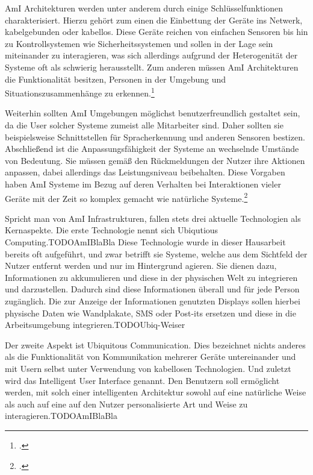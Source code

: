 AmI Architekturen werden unter anderem durch einige Schlüsselfunktionen charakterisiert. Hierzu gehört zum einen die Einbettung der Geräte ins Netwerk, kabelgebunden oder kabellos. Diese Geräte reichen von einfachen Sensoren bis hin zu Kontrollsystemen wie Sicherheitssystemen und sollen in der Lage sein miteinander zu interagieren, was sich allerdings aufgrund der Heterogenität der Systeme oft als schwierig herausstellt. Zum anderen müssen AmI Architekturen die Funktionalität besitzen, Personen in der Umgebung und Situationszusammenhänge zu erkennen.\footcite[Vgl.][Seite 585]{SpecialIssue}

Weiterhin sollten AmI Umgebungen möglichst benutzerfreundlich gestaltet sein, da die User solcher Systeme zumeist alle Mitarbeiter sind. Daher sollten sie beispielsweise Schnittstellen für Spracherkennung und anderen Sensoren bestizen. Abschließend ist die Anpassungsfähigkeit der Systeme an wechselnde Umstände von Bedeutung. Sie müssen gemäß den Rückmeldungen der Nutzer ihre Aktionen anpassen, dabei allerdings das Leistungsniveau beibehalten. Diese Vorgaben haben AmI Systeme im Bezug auf deren Verhalten bei Interaktionen vieler Geräte mit der Zeit so komplex gemacht wie natürliche Systeme.\footcite[Vgl.][Seite 586]{SpecialIssue}

Spricht man von AmI Infrastrukturen, fallen stets drei aktuelle Technologien als Kernaspekte. Die erste Technologie nennt sich Ubiqutious Computing.TODOAmIBlaBla Diese Technologie wurde in dieser Hausarbeit bereits oft aufgeführt, und zwar betrifft sie Systeme, welche aus dem Sichtfeld der Nutzer entfernt werden und nur im Hintergrund agieren. Sie dienen dazu, Informationen zu akkumulieren und diese in der physischen Welt zu integrieren und darzustellen. Dadurch sind diese Informationen überall und für jede Person zugänglich. Die zur Anzeige der Informationen genutzten Displays sollen hierbei physische Daten wie Wandplakate, SMS oder Post-its ersetzen und diese in die Arbeitsumgebung integrieren.TODOUbiq-Weiser 

Der zweite Aspekt ist Ubiquitous Communication. Dies bezeichnet nichts anderes als die Funktionalität von Kommunikation mehrerer Geräte untereinander und mit Usern selbst unter Verwendung von kabellosen Technologien. Und zuletzt wird das Intelligent User Interface genannt. Den Benutzern soll ermöglicht werden, mit solch einer intelligenten Architektur sowohl auf eine natürliche Weise als auch auf eine auf den Nutzer personalisierte Art und Weise zu interagieren.TODOAmIBlaBla

